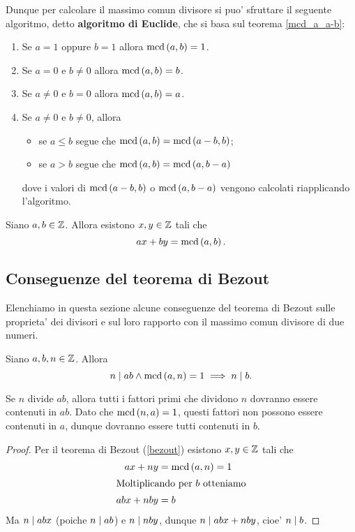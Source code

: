 Dunque per calcolare il massimo comun divisore si puo' sfruttare il seguente algoritmo, detto \textbf{algoritmo di Euclide}, che si basa sul teorema \ref{mcd_a_a-b}:
\begin{enumerate}
    \item Se $a = 1$ oppure $b = 1$ allora $\operatorname{mcd}\left(a, b\right) = 1$.
    \item Se $a = 0$ e $b \neq 0$ allora $\operatorname{mcd}\left(a, b\right) = b$.
    \item Se $a \neq 0$ e $b = 0$ allora $\operatorname{mcd}\left(a, b\right) = a$.
    \item Se $a \neq 0$ e $b \neq 0$, allora
        \begin{itemize}
            \item se $a \leq b$ segue che $\operatorname{mcd}\left(a, b\right) = \operatorname{mcd}\left(a - b, b\right)$;
            \item se $a > b$ segue che $\operatorname{mcd}\left(a, b\right) = \operatorname{mcd}\left(a, b - a\right)$
        \end{itemize}
        dove i valori di $\operatorname{mcd}\left(a - b, b\right)$ o $\operatorname{mcd}\left(a, b - a\right)$ vengono calcolati riapplicando l'algoritmo.
\end{enumerate}

\begin{theorem}
     \label{bezout}
    Siano $a, b \in \mathbb{Z}$. Allora esistono $x, y \in \mathbb{Z}$ tali che
    \begin{equation}
        ax + by = \operatorname{mcd}\left(a, b\right).
    \end{equation}
\end{theorem}

\subsection{Conseguenze del teorema di Bezout}

Elenchiamo in questa sezione alcune conseguenze del teorema di Bezout sulle proprieta' dei divisori e sul loro rapporto con il massimo comun divisore di due numeri.

\begin{proposition} \label{n_divides_product}
    Siano $a, b, n \in \mathbb{Z}$. Allora \begin{equation}
        n \mid ab \land \operatorname{mcd}\left(a, n\right) = 1 \implies n \mid b.
    \end{equation}
\end{proposition}
\begin{intuition}
    Se $n$ divide $ab$, allora tutti i fattori primi che dividono $n$ dovranno essere contenuti in $ab$. Dato che $\operatorname{mcd}\left(n, a\right) = 1$, questi fattori non possono essere contenuti in $a$, dunque dovranno essere tutti contenuti in $b$.
\end{intuition}
\begin{proof}
    Per il teorema di Bezout (\ref{bezout}) esistono $x, y \in \mathbb{Z}$ tali che 
    \begin{align*}
        ax + ny &= \operatorname{mcd}\left(a, n\right) = 1 \\
        \intertext{Moltiplicando per $b$ otteniamo}
        abx + nby &= b 
    \end{align*}
    Ma $n \mid abx$ (poiche $n \mid ab$) e $n \mid nby$, dunque $n \mid abx + nby$, 
    cioe' $n \mid b$.
\end{proof}

